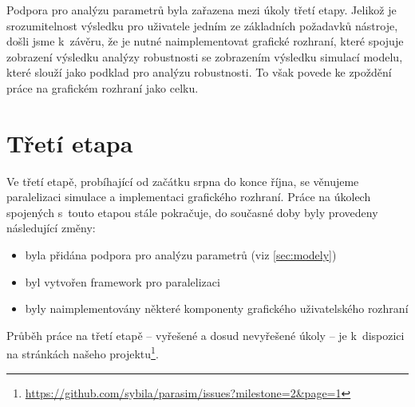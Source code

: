 \documentclass{parasim}
\begin{document}
Podpora pro analýzu parametrů byla zařazena mezi úkoly třetí etapy. Jelikož je srozumitelnost výsledku pro uživatele jedním
ze základních požadavků nástroje, došli jsme k~závěru, že je nutné naimplementovat grafické rozhraní, které spojuje zobrazení výsledku analýzy robustnosti
se zobrazením výsledku simulací modelu, které slouží jako podklad pro analýzu robustnosti. To však povede ke zpoždění práce na grafickém rozhraní jako celku.

\section{Třetí etapa}\label{sec:etapa3}
Ve třetí etapě, probíhající od začátku srpna do konce října, se věnujeme paralelizaci simulace a implementaci grafického rozhraní.
Práce na úkolech spojených s~touto etapou stále pokračuje, do současné doby byly provedeny následující změny:

\begin{itemize}
	\item byla přidána podpora pro analýzu parametrů (viz \ref{sec:modely})
	\item byl vytvořen framework pro paralelizaci
	\item byly naimplementovány některé komponenty grafického uživatelského rozhraní
\end{itemize}


Průběh práce na třetí etapě -- vyřešené a dosud nevyřešené úkoly -- je k~dispozici na stránkách našeho projektu\footnote{\url{https://github.com/sybila/parasim/issues?milestone=2&page=1}}.
\end{document}
